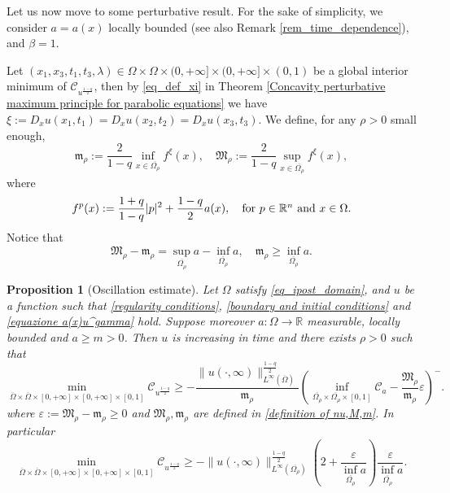 \documentclass[11pt, reqno]{amsart}
\newtheorem{proposition}[lemma]{Proposition}
\theoremstyle{definition}
\numberwithin{equation}{section}
\newcommand{\Omegabar}{\overline{\Omega}}
\newcommand{\R}{\mathbb{R}}
\def\eps{\varepsilon}
\def\abs#1{|#1|}
\def\norm#1{\|#1\|}
\begin{document}
Let us now move to some perturbative result. For the sake of simplicity, we consider $a=a(x)$ locally bounded (see also Remark \ref{rem_time_dependence}), and $\beta=1$. 

 Let $(x_1,x_3,t_1,t_3,\lambda)\in \Omega\times \Omega \times (0,+\infty]\times (0,+\infty]\times (0,1)$ be a global interior minimum of $\mathcal{C}_{u^{\frac{1-q}{2}}}$, then by \eqref{eq_def_xi} in Theorem \ref{Concavity perturbative maximum principle for parabolic equations}
 we have $\xi:=D_xu(x_1,t_1)=D_xu(x_2,t_2)=D_xu(x_3,t_3)$.
 We define, for any $\rho>0$ small enough, 
\begin{equation}\label{definition of nu,M,m}
 \mathfrak{m}_{\rho} :=\frac{2}{1-q} \inf_{x \in \overline{\Omega_{\rho}}}f^{\xi}(x) ,\quad \mathfrak{M}_{\rho} :=\frac{2}{1-q} \sup_{x \in \overline{\Omega_{\rho}}}f^{\xi}(x), 
 \end{equation}
where 
\begin{equation}\label{eq_def_fp}
f^p(x):=\dfrac{1+q}{1-q}\abs{p}^2+\dfrac{1-q}{2}a(x), \quad \hbox{for $p \in \R^n$ and $x \in \Omega$}.
\end{equation}
Notice that
\begin{equation}\label{eq_propr_Mrho_mrho}
 \mathfrak{M}_{\rho} - \mathfrak{m}_{\rho} = \sup _{\overline{\Omega_{\rho}} } a - \inf_{\overline{\Omega_{\rho}}} a, \quad \mathfrak{m}_{\rho} \geq \inf_{\overline{\Omega_{\rho}}} a.
 \end{equation}
	
\begin{proposition}[Oscillation estimate]\label{approximate concavity parabolic application a(x)u^gamma}
	Let $\Omega$ satisfy \eqref{eq_ipost_domain}, and $u$ be a function such that \eqref{regularity conditions}, \eqref{boundary and initial conditions} and \eqref{equazione a(x)u^gamma} hold. 
	Suppose moreover $a\colon\Omega \to \R$ measurable, locally bounded and $a\geq m>0$.
 Then $u$ is increasing in time and there exists $\rho>0$ such that 
 \begin{equation*}
 \min_{\Omegabar\times \Omegabar\times[0,+\infty]\times [0,+\infty]\times[0,1]}\mathcal{C}_{u^{\frac{1-q}{2}}}\geq 
 - \frac{\norm{u(\cdot, \infty)}^{\frac{1-q}{2}}_{L^{\infty}(\Omegabar)}}{\mathfrak{m}_{\rho} } \left(\inf_{\overline{\Omega_\rho}\times \overline{\Omega_\rho} \times [0,1] } \mathcal{C}_{a}-\frac{ \mathfrak{M}_{\rho} }{ \mathfrak{m}_{\rho} }\varepsilon \right)^{-}.
 \end{equation*}
where $\varepsilon:= \mathfrak{M}_{\rho} - \mathfrak{m}_{\rho} \geq 0$ 
and $ \mathfrak{M}_{\rho} , \mathfrak{m}_{\rho} $ are defined in \eqref{definition of nu,M,m}. 
In particular
$$\min_{\Omegabar\times \Omegabar\times[0,+\infty]\times [0,+\infty]\times[0,1]}\mathcal{C}_{u^{\frac{1-q}{2}}} \geq 
-\norm{u(\cdot, \infty)}^{\frac{1-q}{2}}_{L^{\infty}(\overline{\Omega_{\rho}})} \left(2+ \frac{ \eps }{\inf_{\overline{\Omega_{\rho}}} a} \right) \frac{\eps}{\inf_{\overline{\Omega_{\rho}}} a } .$$
\end{proposition}
\end{document}
